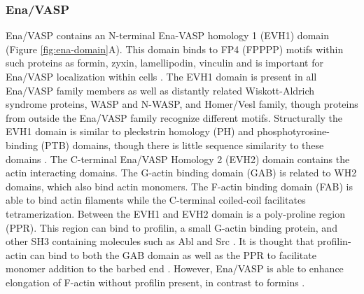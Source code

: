 \subsubsection{Ena/VASP}
Ena/VASP contains an N-terminal Ena-VASP homology 1 (EVH1) domain (Figure \ref{fig:ena-domain}A). This domain binds to FP4 (FPPPP) motifs within such proteins as formin, zyxin, lamellipodin, vinculin and is important for Ena/VASP localization within cells \citep{ball_dual_2000, niebuhr_novel_1997, klostermann_orthologous_2000}. The EVH1 domain is present in all Ena/VASP family members as well as distantly related Wiskott-Aldrich syndrome proteins, WASP and N-WASP, and Homer/Vesl family, though proteins from outside the Ena/VASP family recognize different motifs. Structurally the EVH1 domain is similar to pleckstrin homology (PH) and phosphotyrosine-binding (PTB) domains, though there is little sequence similarity to these domains \citep{prehoda_structure_1999,reinhard_actin-based_2001,ball_dual_2000,fedorov_structure_1999}.
The C-terminal Ena/VASP Homology 2 (EVH2) domain contains the actin interacting domains. The G-actin binding domain (GAB) is related to WH2 domains, which also bind actin monomers. The F-actin binding domain (FAB) is able to bind actin filaments while the C-terminal coiled-coil facilitates tetramerization. Between the EVH1 and EVH2 domain is a poly-proline region (PPR). This region can bind to profilin, a small G-actin binding protein, and other SH3 containing molecules such as Abl and Src \citep{lanier_abl_2000, gertler_mena_1996}. It is thought that profilin-actin can bind to both the GAB domain as well as the PPR to facilitate monomer addition to the barbed end \citep{ferron_structural_2007}. However, Ena/VASP is able to enhance elongation of F-actin without profilin present, in contrast to formins \citep{hansen_vasp_2010,breitsprecher_molecular_2011,winkelman_ena/vasp_2014,bruhmann_distinct_2017}.

